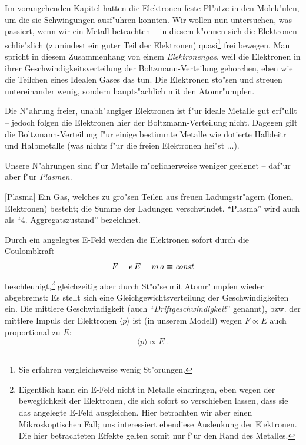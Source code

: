 \documentclass[twoside,a4paper]{book}
\newcommand{\const}{\ensuremath{\text{\emph{const}}}}
\newenvironment{Def}[1][]{%
\definecolor{shadethmcolor}{rgb}{.95,.95,.95}%
\definecolor{shaderulecolor}{rgb}{0.8,0.8,0.8}%
\setlength{\shadeboxrule}{1pt}%
\begin{Defi}[#1]%
 }{\end{Defi}}
\begin{document}
Im vorangehenden Kapitel hatten die Elektronen feste Pl"atze in den
Molek"ulen, um die sie Schwingungen ausf"uhren konnten. Wir wollen nun
untersuchen, was passiert, wenn wir ein Metall betrachten -- in diesem
k"onnen sich die Elektronen schlie"slich (zumindest ein guter Teil der
Elektronen) quasi\footnote{Sie erfahren vergleichsweise wenig
  St"orungen.} frei bewegen. Man spricht in diesem Zusammenhang von
einem \emph{Elektronengas}, weil die Elektronen
in ihrer Geschwindigkeitsverteilung der
Boltzmann-Verteilung gehorchen, eben wie
die Teilchen eines Idealen Gases das tun. Die Elektronen sto"sen und
streuen untereinander wenig, sondern haupts"achlich mit den
Atomr"umpfen.


Die N"ahrung freier, unabh"angiger Elektronen ist f"ur ideale Metalle
gut erf"ullt -- jedoch folgen die Elektronen hier der
Boltzmann-Verteilung nicht. Dagegen gilt die Boltzmann-Verteilung f"ur
einige bestimmte Metalle wie dotierte Halbleitr und Halbmetalle (was
nichts f"ur die freien Elektronen hei"st ...).

\begin{Wichtig}
   Unsere N"ahrungen sind f"ur Metalle m"oglicherweise weniger
   geeignet -- daf"ur aber f"ur \emph{Plasmen}.
\end{Wichtig}
\begin{Def}
   [Plasma] Ein Gas, welches zu gro"sen Teilen aus
   freuen Ladungstr"agern (Ionen, Elektronen) besteht; die Summe der
   Ladungen verschwindet. "`Plasma"' wird auch als
   "`4. Aggregatszustand"' bezeichnet.
\end{Def}


Durch ein angelegtes E-Feld werden die Elektronen sofort durch die
Coulombkraft
\begin{equation*}
   F = e\, E = m \, a \equiv \const
\end{equation*}
beschleunigt,\footnote{Eigentlich kann ein E-Feld nicht in Metalle
  eindringen, eben wegen der beweglichkeit der Elektronen, die sich
  sofort so verschieben lassen, dass sie das angelegte E-Feld
  ausgleichen. Hier betrachten wir aber einen Mikroskoptischen Fall;
  uns interessiert ebendiese Auslenkung der Elektronen. Die hier
  betrachteten Effekte gelten somit nur f"ur den Rand des Metalles.}
gleichzeitig aber durch St"o"se mit Atomr"umpfen wieder abgebremst: Es
stellt sich eine Gleichgewichtsverteilung der Geschwindigkeiten
ein. Die mittlere Geschwindigkeit (auch
"`\emph{Driftgeschwindigkeit}"' genannt),
bzw. der mittlere Impuls der Elektronen $\langle p \rangle$ ist (in
unserem Modell) wegen $F \propto E$ auch proportional zu $E$:
\begin{equation*}
   \langle  p  \rangle \propto E \;.
\end{equation*}
\end{document}

